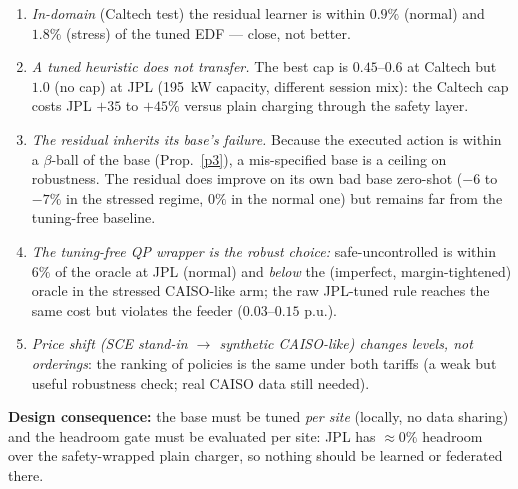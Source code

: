 \begin{enumerate}[label=(\alph*)]
\item \emph{In-domain} (Caltech test) the residual learner is within $0.9\%$ (normal) and $1.8\%$ (stress) of the tuned EDF --- close, not better.
\item \emph{A tuned heuristic does not transfer.} The best cap is $0.45$--$0.6$ at Caltech but $1.0$ (no cap) at JPL (195~kW capacity, different session mix): the Caltech cap costs JPL $+35$ to $+45\%$ versus plain charging through the safety layer.
\item \emph{The residual inherits its base's failure.} Because the executed action is within a $\beta$-ball of the base (Prop.~\ref{p3}), a mis-specified base is a ceiling on robustness. The residual does improve on its own bad base zero-shot ($-6$ to $-7\%$ in the stressed regime, $0\%$ in the normal one) but remains far from the tuning-free baseline.
\item \emph{The tuning-free QP wrapper is the robust choice:} safe-uncontrolled is within $6\%$ of the oracle at JPL (normal) and \emph{below} the (imperfect, margin-tightened) oracle in the stressed CAISO-like arm; the raw JPL-tuned rule reaches the same cost but violates the feeder ($0.03$--$0.15$ p.u.).
\item \emph{Price shift (SCE stand-in $\to$ synthetic CAISO-like) changes levels, not orderings}: the ranking of policies is the same under both tariffs (a weak but useful robustness check; real CAISO data still needed).
\end{enumerate}
\textbf{Design consequence:} the base must be tuned \emph{per site} (locally, no data sharing) and the headroom gate must be evaluated per site: JPL has $\approx0\%$ headroom over the safety-wrapped plain charger, so nothing should be learned or federated there.

